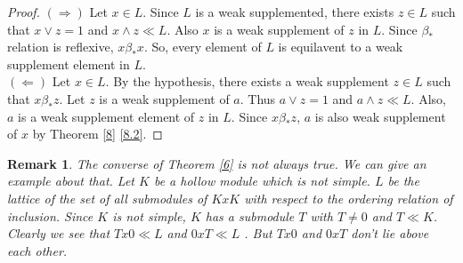 \documentclass[a4paper,12pt]{article}
\newtheorem{remark}[theorem]{Remark}
\numberwithin{equation}{section}
\begin{document}
\begin{proof}
  $ ( \Rightarrow ) $ 
  Let $ x \in L $. Since $ L $ is a weak supplemented, there exists $ z \in L $ such that 
  $ x \vee z = 1 $ and $ x \wedge z \ll L $. Also $ x $ is a weak supplement of $ z $ in $ L $. 
  Since $ \beta_* $ relation is reflexive, $ x \beta_* x $. So, every element of $ L $ is 
  equilavent to a weak supplement element in $ L $. \\
  $ ( \Leftarrow ) $
  Let $ x \in L $. By the hypothesis, there exists a weak supplement $ z \in L $ such that 
  $ x \beta_* z $. Let $ z $ is a weak supplement of $ a $. Thus $ a \vee z = 1 $ and $ a \wedge z \ll L $. 
  Also, $ a $ is a weak supplement element of $ z $ in $ L $. Since $ x \beta_* z $, 
  $ a $ is also weak supplement of $ x $ by Theorem \ref{8} \ref{8.2}.  
\end{proof}
\begin{remark}
  The converse of Theorem \ref{6} is not always true. We can give an example about that. Let $ K $ be a hollow module which is not simple. 
  $ L $ be the lattice of the set of all submodules of $ KxK $ with respect to the ordering relation of inclusion. 
  Since $ K $ is not simple, $ K $ has a submodule $ T $ with $ T \neq 0 $ and $ T \ll K $. Clearly we see that $ Tx0 \ll L $ and $ 0xT \ll L $ . 
  But $ Tx0 $ and $ 0xT $ don't lie above each other.
\end{remark}


\cleardoublepage
\nocite{*}
\printbibliography[maxnames=99]
\end{document}

